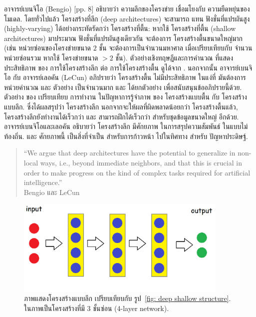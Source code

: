 อาจารย์เบนจิโอ (Bengio) \cite{Bengio2009a}[pp. 8] อธิบายว่า ความลึกของโครงข่าย เชื่อมโยงกับ ความยืดหยุ่นของโมเดล.
%
โดยทั่วไปแล้ว โครงสร้างที่ลึก (deep architectures) จะสามารถ แทน ฟังชั่นที่แปรผันสูง (highly-varying) ได้อย่างกระทัดรัดกว่า โครงสร้างที่ตื้น:
หากใช้ โครงสร้างที่ตื้น (shallow architectures) มาประมาณ ฟังชั่นที่แปรผันสูงเดียวกัน จะต้องการ โครงสร้างตื้นขนาดใหญ่มาก (เช่น หน่วยซ่อนของโครงข่ายขนาด $2$ ชั้น จะต้องการเป็นจำนวนมหาศาล เมื่อเปรียบเทียบกับ จำนวนหน่วยซ่อนรวม หากใช้ โครงข่ายขนาด $>2$ ชั้น).
ตัวอย่างเชิงทฤษฎีและการคำนวณ ที่แสดง ประสิทธิภาพ ของ การใช้โครงสร้างลึก ต่อ การใช้โครงสร้างตื้น ดูได้จาก \cite{Bengio2009a}.
นอกจากนั้น อาจารย์เบนจิโอ กับ อาจารย์เลอคัน (LeCun) \cite{BengioLeCun2007a} อภิปรายว่า 
โครงสร้างตื้น ไม่มีประสิทธิภาพ ในแง่ที่ มันต้องการ หน่วยคำนวณ และ ตัวอย่าง เป็นจำนวนมาก
และ ได้ยกตัวอย่าง เพื่อสนับสนุนข้ออภิปรายนี้ด้วย. 
ตัวอย่าง ของ \cite{BengioLeCun2007a} เปรียบเทียบ การทำงาน ในปัญหาการรู้จำภาพ ของ โครงสร้างแบบตื้น กับ โครงสร้างแบบลึก.
ซึ่งได้ผลสรุปว่า โครงสร้างลึก นอกจากจะให้ผลที่ผิดพลาดน้อยกว่า โครงสร้างตื้นแล้ว,
โครงสร้างลึกยังทำงานได้เร็วกว่า และ สามารถฝึกได้เร็วกว่า สำหรับชุดข้อมูลขนาดใหญ่ อีกด้วย.
อาจารย์เบนจิโอและเลอคัน อธิบายว่า โครงสร้างลึก มีศักยภาพ ในการสรุปความสัมพันธ์ ในแบบไม่ท้องถิ่น.
และ ศักยภาพนี้ เป็นสิ่งที่จำเป็น สำหรับการก้าวหน้า ไปในทิศทาง สำหรับ ปัญหาประดิษฐ์.

\begin{verse}
``We argue that deep architectures have the potential to generalize in non-local ways, i.e., beyond immediate neighbors, and that this is crucial in order to make progress on the kind of complex tasks required for artificial intelligence.''
\\Bengio และ LeCun\cite{BengioLeCun2007a} 
\end{verse}

%
\begin{figure}
\begin{center}
\includegraphics[width=4in]{04ANNDeep/DeepStructure.png}
\end{center}
\caption{ภาพแสดงโครงสร้างแบบลึก เปรียบเทียบกับ รูป~\ref{fig: deep shallow structure}.
  ในภาพเป็นโครงสร้างที่มี 3 ชั้นซ่อน (4-layer network).}
\label{fig: deep deep structure}
\end{figure}
%

